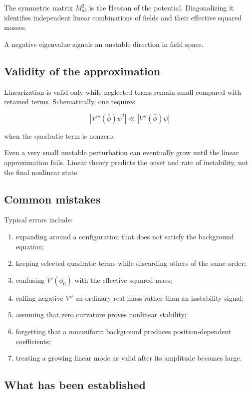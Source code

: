 The symmetric matrix \(M^{2}_{ab}\) is the Hessian of the potential. Diagonalizing it identifies independent linear combinations of fields and their effective squared masses.

A negative eigenvalue signals an unstable direction in field space.

\subsection{Validity of the approximation}

Linearization is valid only while neglected terms remain small compared with retained terms. Schematically, one requires

\[
|V'''(\bar\phi)\psi^{2}|
\ll
|V''(\bar\phi)\psi|
\]

when the quadratic term is nonzero.

Even a very small unstable perturbation can eventually grow until the linear approximation fails. Linear theory predicts the onset and rate of instability, not the final nonlinear state.

\subsection{Common mistakes}

Typical errors include:

\begin{enumerate}
    \item expanding around a configuration that does not satisfy the background equation;
    \item keeping selected quadratic terms while discarding others of the same order;
    \item confusing \(V'(\phi_{0})\) with the effective squared mass;
    \item calling negative \(V''\) an ordinary real mass rather than an instability signal;
    \item assuming that zero curvature proves nonlinear stability;
    \item forgetting that a nonuniform background produces position-dependent coefficients;
    \item treating a growing linear mode as valid after its amplitude becomes large.
\end{enumerate}

\subsection{What has been established}

